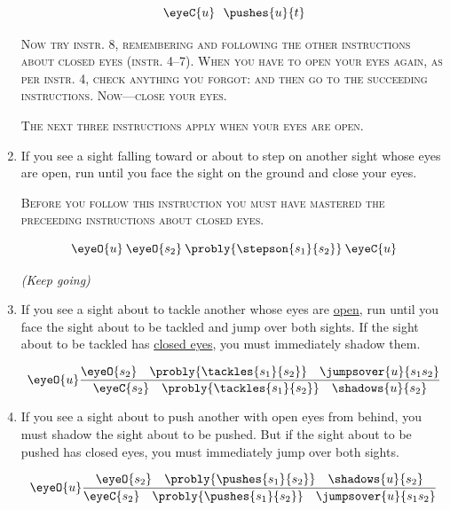 \begin{enumerate}[label=\arabic*.,nosep, wide]
\begin{equation*}
  \eyeC{u} \:\:\: \pushes{u}{t}
\end{equation*}

\vfill

\textsc{Now try instr. 8, remembering and following the other instructions about closed eyes (instr. 4--7).
When you have to open your eyes again, as per instr. 4, check anything you forgot: and then go to the
succeeding instructions. Now---close your eyes.}

\vfill

\textsc{The next three instructions apply when your eyes are open.}

\vfill
\item If you see a sight falling toward or about to step on another sight 
whose eyes are open, run until you face the sight on the ground and close 
your eyes. 

\textsc{Before you follow this instruction you must have mastered the preceeding instructions about closed eyes.}

\begin{equation*}
  \eyeO{u}\:\eyeO{s_2}\:\probly{\stepson{s_1}{s_2}}\:\eyeC{u}
\end{equation*}

\vfill
\textit{(Keep going) }

\clearpage


\vfill
\item If you see a sight about to tackle another whose eyes are \uline{open}, run 
until you face the sight about to be tackled and jump over both sights. If the 
sight about to be tackled has \uline{closed eyes}, you must immediately shadow 
them. 

\vfill
\begin{equation*}
  \eyeO{u}\dfrac{%
      \eyeO{s_2}\quad\probly{\tackles{s_1}{s_2}}\quad\jumpsover{u}{s_1 s_2}%
    }{%
      \eyeC{s_2}\quad\probly{\tackles{s_1}{s_2}}\quad\shadows{u}{s_2}%
    }
\end{equation*}

\vfill
\item If you see a sight about to push another with open eyes from 
behind, you must shadow the sight about to be pushed. But if the sight 
about to be pushed has closed eyes, you must immediately jump over both 
sights. 


\vfill

\begin{equation*}
  \eyeO{u}\dfrac{%
    \eyeO{s_2}\quad\probly{\pushes{s_1}{s_2}}\quad\shadows{u}{s_2}
    }{%
      \eyeC{s_2}\quad\probly{\pushes{s_1}{s_2}}\quad\jumpsover{u}{s_1 s_2}
    }
\end{equation*}

\end{enumerate}

